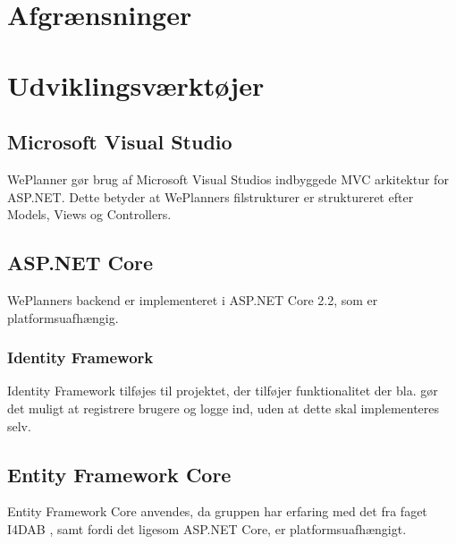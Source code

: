 \section{Afgrænsninger}


\section{Udviklingsværktøjer}

\subsection{Microsoft Visual Studio}
WePlanner gør brug af Microsoft Visual Studios  indbyggede MVC arkitektur for ASP.NET. Dette betyder at WePlanners filstrukturer er struktureret efter Models, Views og Controllers.

\subsection{ASP.NET Core}
WePlanners backend er implementeret i ASP.NET Core 2.2, som er platformsuafhængig.  

\subsubsection{Identity Framework}
Identity Framework  tilføjes til projektet, der tilføjer funktionalitet der bla. gør det muligt at registrere brugere og logge ind, uden at dette skal implementeres selv.

\subsection{Entity Framework Core}
Entity Framework Core anvendes, da gruppen har erfaring med det fra faget I4DAB \cite{DAB}, samt fordi det ligesom ASP.NET Core, er platformsuafhængigt.
